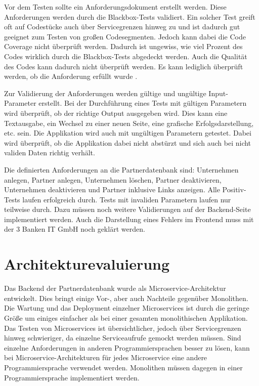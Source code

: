 Vor dem Testen sollte ein Anforderungsdokument erstellt werden. Diese Anforderungen werden durch die Blackbox-Tests validiert. Ein solcher Test greift oft auf Codestücke auch über Servicegrenzen hinweg zu und ist dadurch gut geeignet zum Testen von großen Codesegmenten.
Jedoch kann dabei die Code Coverage nicht überprüft werden. Dadurch ist ungewiss, wie viel Prozent des Codes wirklich durch die Blackbox-Tests abgedeckt werden. Auch die Qualität des Codes kann dadurch nicht überprüft werden. Es kann lediglich überprüft werden, ob die Anforderung erfüllt wurde \cite{SoftwareQualityAssurance}.

Zur Validierung der Anforderungen werden gültige und ungültige Input-Parameter erstellt. Bei der Durchführung eines Tests mit gültigen Parametern wird überprüft, ob der richtige Output ausgegeben wird. Dies kann eine Textausgabe, ein Wechsel zu einer neuen Seite, eine grafische Erfolgsdarstellung, etc. sein. Die Applikation wird auch mit ungültigen Parametern getestet. Dabei wird überprüft, ob die Applikation dabei nicht abstürzt und sich auch bei nicht validen Daten richtig verhält.

Die definierten Anforderungen an die Partnerdatenbank sind: Unternehmen anlegen, Partner anlegen, Unternehmen löschen, Partner deaktivieren, Unternehmen deaktivieren und Partner inklusive Links anzeigen.
Alle Positiv-Tests laufen erfolgreich durch. Tests mit invaliden Parametern laufen nur teilweise durch. Dazu müssen noch weitere Validierungen auf der Backend-Seite implementiert werden. Auch die Darstellung eines Fehlers im Frontend muss mit der 3 Banken IT GmbH noch geklärt werden.

\section{Architekturevaluierung}
Das Backend der Partnerdatenbank wurde als Microservice-Architektur entwickelt. Dies bringt einige Vor-, aber auch Nachteile gegenüber Monolithen.
Die Wartung und das Deployment einzelner Microservices ist durch die geringe Größe um einiges einfacher als bei einer gesamten monolithischen Applikation. Das Testen von Microservices ist übersichtlicher, jedoch über Servicegrenzen hinweg schwieriger, da einzelne Serviceaufrufe gemockt werden müssen.
Sind einzelne Anforderungen in anderen Programmiersprachen besser zu lösen, kann bei Microservice-Architekturen für jedes Microservice eine andere Programmiersprache verwendet werden. Monolithen müssen dagegen in einer Programmiersprache implementiert werden.

